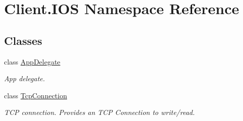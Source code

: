 \hypertarget{namespaceClient_1_1IOS}{}\section{Client.\+I\+O\+S Namespace Reference}
\label{namespaceClient_1_1IOS}
\subsection*{Classes}
\begin{DoxyCompactItemize}
\item 
class \hyperlink{classClient_1_1IOS_1_1AppDelegate}{App\+Delegate}
\begin{DoxyCompactList}\small\item\em App delegate. \end{DoxyCompactList}\item 
class \hyperlink{classClient_1_1IOS_1_1TcpConnection}{Tcp\+Connection}
\begin{DoxyCompactList}\small\item\em T\+C\+P connection. Provides an T\+C\+P Connection to write/read. \end{DoxyCompactList}\end{DoxyCompactItemize}
